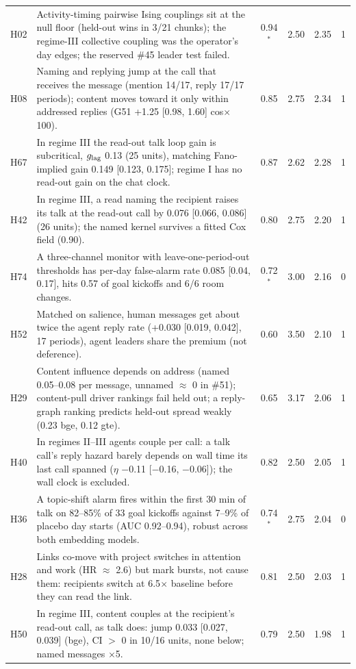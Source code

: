 \begin{table}[!h]
\begin{tabular}{@{}l p{} c c c c@{}}
H02 & Activity-timing pairwise Ising couplings sit at the null floor (held-out wins in 3/21 chunks); the regime-III collective coupling was the operator's day edges; the reserved \#45 leader test failed. & 0.94$^\ast$ & 2.50 & 2.35 & 1\\
H08 & Naming and replying jump at the call that receives the message (mention 14/17, reply 17/17 periods); content moves toward it only within addressed replies (G51 +1.25 [0.98, 1.60] cos$\times$100). & 0.85 & 2.75 & 2.34 & 1\\
H67 & In regime III the read-out talk loop gain is subcritical, $g_{\rm lag}$ 0.13 (25 units), matching Fano-implied gain 0.149 [0.123, 0.175]; regime I has no read-out gain on the chat clock. & 0.87 & 2.62 & 2.28 & 1\\
H42 & In regime III, a read naming the recipient raises its talk at the read-out call by 0.076 [0.066, 0.086] (26 units); the named kernel survives a fitted Cox field (0.90). & 0.80 & 2.75 & 2.20 & 1\\
H74 & A three-channel monitor with leave-one-period-out thresholds has per-day false-alarm rate 0.085 [0.04, 0.17], hits 0.57 of goal kickoffs and 6/6 room changes. & 0.72$^\ast$ & 3.00 & 2.16 & 0\\
H52 & Matched on salience, human messages get about twice the agent reply rate (+0.030 [0.019, 0.042], 17 periods), agent leaders share the premium (not deference). & 0.60 & 3.50 & 2.10 & 1\\
H29 & Content influence depends on address (named 0.05--0.08 per message, unnamed $\approx$ 0 in \#51); content-pull driver rankings fail held out; a reply-graph ranking predicts held-out spread weakly (0.23 bge, 0.12 gte). & 0.65 & 3.17 & 2.06 & 1\\
H40 & In regimes II--III agents couple per call: a talk call's reply hazard barely depends on wall time its last call spanned ($\eta$ $-$0.11 [$-$0.16, $-$0.06]); the wall clock is excluded. & 0.82 & 2.50 & 2.05 & 1\\
H36 & A topic-shift alarm fires within the first 30 min of talk on 82--85\% of 33 goal kickoffs against 7--9\% of placebo day starts (AUC 0.92--0.94), robust across both embedding models. & 0.74$^\ast$ & 2.75 & 2.04 & 0\\
H28 & Links co-move with project switches in attention and work (HR $\approx$ 2.6) but mark bursts, not cause them: recipients switch at 6.5$\times$ baseline before they can read the link. & 0.81 & 2.50 & 2.03 & 1\\
H50 & In regime III, content couples at the recipient's read-out call, as talk does: jump 0.033 [0.027, 0.039] (bge), CI $>$ 0 in 10/16 units, none below; named messages $\times$5. & 0.79 & 2.50 & 1.98 & 1\\

\end{tabular}
\end{table}
